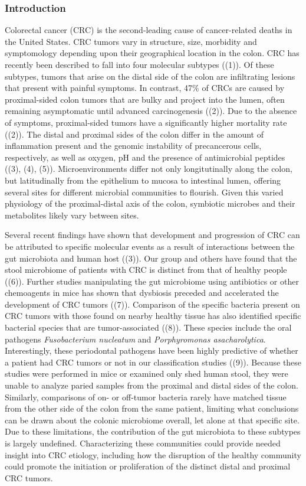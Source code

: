 \documentclass[11pt,]{article}
\begin{document}
\subsubsection{Introduction}\label{introduction}

Colorectal cancer (CRC) is the second-leading cause of cancer-related
deaths in the United States. CRC tumors vary in structure, size,
morbidity and symptomology depending upon their geographical location in
the colon. CRC has recently been described to fall into four molecular
subtypes ((1)). Of these subtypes, tumors that arise on the distal side
of the colon are infiltrating lesions that present with painful
symptoms. In contrast, 47\% of CRCs are caused by proximal-sided colon
tumors that are bulky and project into the lumen, often remaining
asymptomatic until advanced carcinogenesis ((2)). Due to the absence of
symptoms, proximal-sided tumors have a significantly higher mortality
rate ((2)). The distal and proximal sides of the colon differ in the
amount of inflammation present and the genomic instability of
precancerous cells, respectively, as well as oxygen, pH and the presence
of antimicrobial peptides ((3), (4), (5)). Microenvironments differ not
only longitutinally along the colon, but latitudinally from the
epithelium to mucosa to intestinal lumen, offering several sites for
different microbial communities to flourish. Given this varied
physiology of the proximal-distal axis of the colon, symbiotic microbes
and their metabolites likely vary between sites.

Several recent findings have shown that development and progression of
CRC can be attributed to specific molecular events as a result of
interactions between the gut microbiota and human host ((3)). Our group
and others have found that the stool microbiome of patients with CRC is
distinct from that of healthy people ((6)). Further studies manipulating
the gut microbiome using antibiotics or other chemoagents in mice has
shown that dysbiosis preceded and accelerated the development of CRC
tumors ((7)). Comparison of the specific bacteria present on CRC tumors
with those found on nearby healthy tissue has also identified specific
bacterial species that are tumor-associated ((8)). These species include
the oral pathogens \emph{Fusobacterium nucleatum} and
\emph{Porphyromonas asacharolytica}. Interestingly, these periodontal
pathogens have been highly predictive of whether a patient had CRC
tumors or not in our classification studies ((9)). Because these studies
were performed in mice or examined only shed human stool, they were
unable to analyze paried samples from the proximal and distal sides of
the colon. Similarly, comparisons of on- or off-tumor bacteria rarely
have matched tissue from the other side of the colon from the same
patient, limiting what conclusions can be drawn about the colonic
microbiome overall, let alone at that specific site. Due to these
limitations, the contribution of the gut microbiota to these subtypes is
largely undefined. Characterizing these communities could provide needed
insight into CRC etiology, including how the disruption of the healthy
community could promote the initiation or proliferation of the distinct
distal and proximal CRC tumors.
\end{document}
